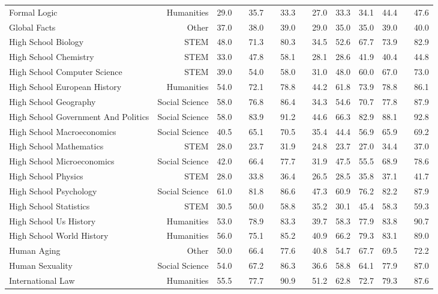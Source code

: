 \documentclass[11pt]{article}
\begin{document}
\begin{table}
{\begin{tabular}{@{}lr cc cc cc cccc c c@{}}
Formal Logic & Humanities & 29.0 && 35.7 && 33.3 && 27.0 & 33.3 & 34.1 & 44.4 && 47.6  \\
Global Facts & Other & 37.0 && 38.0 && 39.0 && 29.0 & 35.0 & 35.0 & 39.0 && 40.0  \\
High School Biology & STEM & 48.0 && 71.3 && 80.3 && 34.5 & 52.6 & 67.7 & 73.9 && 82.9  \\
High School Chemistry & STEM & 33.0 && 47.8 && 58.1 && 28.1 & 28.6 & 41.9 & 40.4 && 44.8  \\
High School Computer Science & STEM & 39.0 && 54.0 && 58.0 && 31.0 & 48.0 & 60.0 & 67.0 && 73.0  \\
High School European History & Humanities & 54.0 && 72.1 && 78.8 && 44.2 & 61.8 & 73.9 & 78.8 && 86.1  \\
High School Geography & Social Science & 58.0 && 76.8 && 86.4 && 34.3 & 54.6 & 70.7 & 77.8 && 87.9  \\
High School Government And Politics & Social Science & 58.0 && 83.9 && 91.2 && 44.6 & 66.3 & 82.9 & 88.1 && 92.8  \\
High School Macroeconomics & Social Science & 40.5 && 65.1 && 70.5 && 35.4 & 44.4 & 56.9 & 65.9 && 69.2  \\
High School Mathematics & STEM & 28.0 && 23.7 && 31.9 && 24.8 & 23.7 & 27.0 & 34.4 && 37.0  \\
High School Microeconomics & Social Science & 42.0 && 66.4 && 77.7 && 31.9 & 47.5 & 55.5 & 68.9 && 78.6  \\
High School Physics & STEM & 28.0 && 33.8 && 36.4 && 26.5 & 28.5 & 35.8 & 37.1 && 41.7  \\
High School Psychology & Social Science & 61.0 && 81.8 && 86.6 && 47.3 & 60.9 & 76.2 & 82.2 && 87.9  \\
High School Statistics & STEM & 30.5 && 50.0 && 58.8 && 35.2 & 30.1 & 45.4 & 58.3 && 59.3  \\
High School Us History & Humanities & 53.0 && 78.9 && 83.3 && 39.7 & 58.3 & 77.9 & 83.8 && 90.7  \\
High School World History & Humanities & 56.0 && 75.1 && 85.2 && 40.9 & 66.2 & 79.3 & 83.1 && 89.0  \\
Human Aging & Other & 50.0 && 66.4 && 77.6 && 40.8 & 54.7 & 67.7 & 69.5 && 72.2  \\
Human Sexuality & Social Science & 54.0 && 67.2 && 86.3 && 36.6 & 58.8 & 64.1 & 77.9 && 87.0  \\
International Law & Humanities & 55.5 && 77.7 && 90.9 && 51.2 & 62.8 & 72.7 & 79.3 && 87.6  \\

\end{tabular}}
\end{table}
\end{document}
